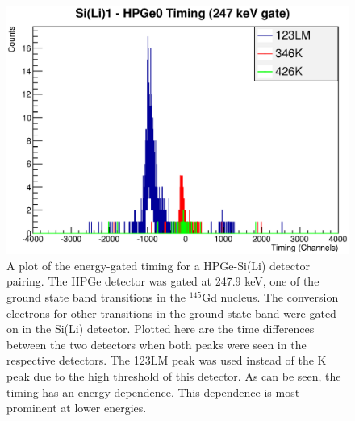 \begin{figure}
    \centering
    \includegraphics[scale=0.7]{Analysis_Figs/TimingvEnergy.eps}
    \caption{A plot of the energy-gated timing for a HPGe-Si(Li) detector pairing. The HPGe detector was gated at 247.9 keV, one of the ground state band transitions in the $^{145}$Gd nucleus. The conversion electrons for other transitions in the ground state band were gated on in the Si(Li) detector. Plotted here are the time differences between the two detectors when both peaks were seen in the respective detectors. The 123LM peak was used instead of the K peak due to the high threshold of this detector. As can be seen, the timing has an energy dependence. This dependence is most prominent at lower energies.}
    \label{fig:timing_georgina}
\end{figure}